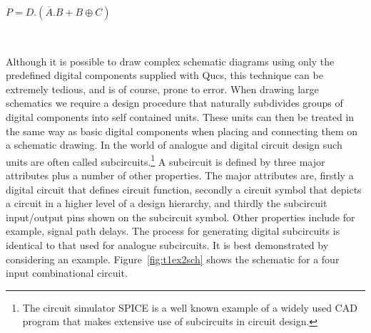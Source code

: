 \begin{center}
\begin{large}$P=D.(\overline{A}.B+B \oplus C )$\end{large}
\end{center}

\begin{figure}
  \centering
{}
\end{figure}
\FloatBarrier

\begin{table}
  \centering
{}
\\
\end{table}
\FloatBarrier


Although it is possible to draw complex schematic diagrams using only
the predefined digital components supplied with Qucs, this technique
can be extremely tedious, and is of course, prone to error.  When
drawing large schematics we require a design procedure that naturally
subdivides groups of digital components into self contained units.
These units can then be treated in the same way as basic digital
components when placing and connecting them on a schematic drawing.
In the world of analogue and digital circuit design such units are
often called subcircuits.\footnote{The circuit simulator SPICE is a
well known example of a widely used CAD program that makes extensive
use of subcircuits in circuit design.}  A subcircuit is defined by
three major attributes plus a number of other properties. The major
attributes are, firstly a digital circuit that defines circuit
function, secondly a circuit symbol that depicts a circuit in a higher
level of a design hierarchy, and thirdly the subcircuit input/output
pins shown on the subcircuit symbol.  Other properties include for
example, signal path delays. The process for generating digital
subcircuits is identical to that used for analogue subcircuits.  It is
best demonstrated by considering an example.
Figure~\ref{fig:t1ex2sch} shows the schematic for a four input
combinational circuit.


